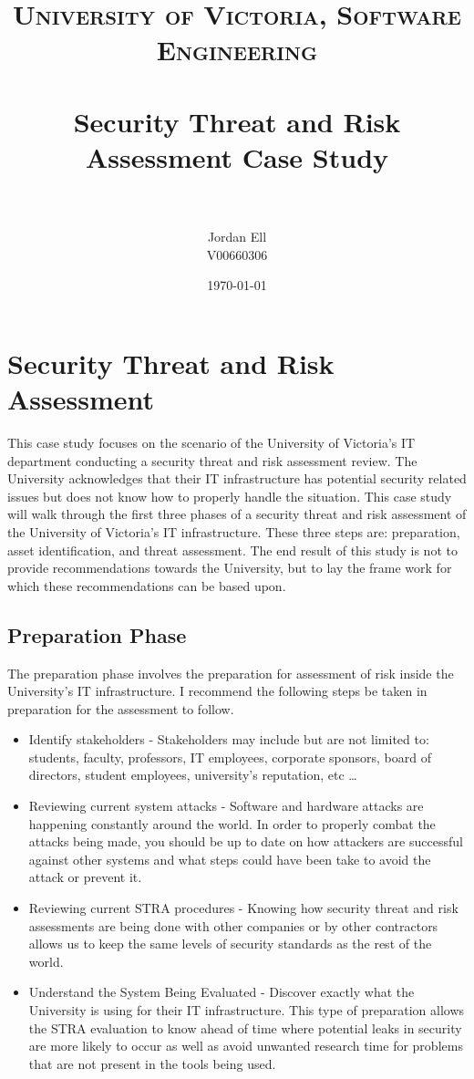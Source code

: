 \documentclass[paper=a4, fontsize=11pt]{scrartcl} %
\title{	
\normalfont \normalsize 
\textsc{University of Victoria, Software Engineering} \\ [25pt] %
\horrule{0.5pt} \\[0.4cm] %
\huge Security Threat and Risk Assessment Case Study \\ %
\horrule{2pt} \\[0.5cm] %
}
\author{Jordan Ell \\ V00660306} %
\date{\normalsize\today} %
\numberwithin{equation}{section} %
\numberwithin{figure}{section} %
\numberwithin{table}{section} %
\begin{document}
\maketitle %


\section{Security Threat and Risk Assessment}
This case study focuses on the scenario of the University of Victoria's IT department conducting a security threat and risk assessment
review. The University acknowledges that their IT infrastructure has potential security related issues but does not know how to
properly handle the situation. This case study will walk through the first three phases of a security threat and risk 
assessment of the University of Victoria's IT infrastructure. These three steps are: preparation, asset identification, and
threat assessment. The end result of this study is not to provide recommendations towards the University, but to
lay the frame work for which these recommendations can be based upon.


\subsection{Preparation Phase}
The preparation phase involves the preparation for assessment of risk inside the University's IT infrastructure. I recommend
the following steps be taken in preparation for the assessment to follow.

\begin{itemize}
  \item Identify stakeholders - Stakeholders may include but are not limited to: students, faculty, professors, IT employees,
  corporate sponsors, board of directors, student employees, university's reputation, etc \ldots
  \item Reviewing current system attacks - Software and hardware attacks are happening constantly around the world. In order
  to properly combat the attacks being made, you should be up to date on how attackers are successful against other systems
  and what steps could have been take to avoid the attack or prevent it.
  \item Reviewing current STRA procedures - Knowing how security threat and risk assessments are being done with
  other companies or by other contractors allows us to keep the same levels of security standards as the rest of the world.
  \item Understand the System Being Evaluated - Discover exactly what the University is using for their IT infrastructure. This
  type of preparation allows the STRA evaluation to know ahead of time where potential leaks in security are more likely to
  occur as well as avoid unwanted research time for problems that are not present in the tools  being used.
\end{itemize}
\end{document}
